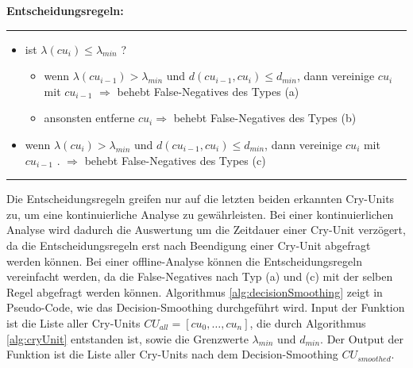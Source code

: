 \textbf{Entscheidungsregeln: }\noindent\rule{0.7\linewidth}{0.3pt}
\begin{itemize}
	\item ist $\lambda (cu_{i}) \leq \lambda_{min}$ ?
	\begin{itemize}
		\item wenn $\lambda (cu_{i-1}) > \lambda_{min}$ und $d (cu_{i-1}, cu_{i}) \leq d_{min}$, dann vereinige $cu_{i}$ mit $cu_{i-1}$ $\Longrightarrow$ behebt False-Negatives des Types (a)
		\item ansonsten entferne $cu_i \Longrightarrow$ behebt False-Negatives des Types (b)
	\end{itemize}
	\item wenn $\lambda (cu_{i}) > \lambda_{min}$ und $d (cu_{i-1}, cu_{i}) \leq d_{min}$, dann vereinige $cu_{i}$ mit $cu_{i-1}$ . $\Rightarrow$ behebt False-Negatives des Types (c)
\end{itemize}
\noindent\rule{\linewidth}{0.3pt}

Die Entscheidungsregeln greifen nur auf die letzten beiden erkannten Cry-Units zu, um eine kontinuierliche Analyse zu gewährleisten. Bei einer kontinuierlichen Analyse wird dadurch die Auswertung um die Zeitdauer einer Cry-Unit verzögert, da die Entscheidungsregeln erst nach Beendigung einer Cry-Unit abgefragt werden können. Bei einer offline-Analyse können die Entscheidungsregeln vereinfacht werden, da die False-Negatives nach Typ (a) und (c) mit der selben Regel abgefragt werden können. Algorithmus \ref{alg:decisionSmoothing} zeigt in Pseudo-Code, wie das Decision-Smoothing durchgeführt wird. Input der Funktion ist die Liste aller Cry-Units $CU_{all} = [cu_0 , \ldots , cu_n]$, die durch Algorithmus \ref{alg:cryUnit} entstanden ist, sowie die Grenzwerte $\lambda_{min}$ und $d_{min}$. Der Output der Funktion ist die Liste aller Cry-Units nach dem Decision-Smoothing $CU_{smoothed}$.

